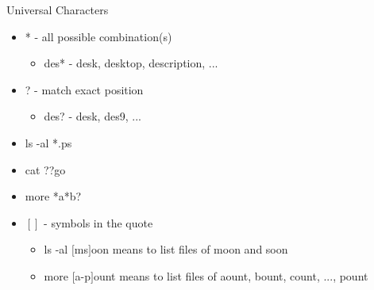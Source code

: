 \documentclass{beamer}
\begin{document}
\begin{frame}{Universal Characters}
\begin{itemize}
\item * - all possible combination(s)
\begin{itemize}
\item des* - desk, desktop, description, ...
\end{itemize}
\item ? - match exact position
\begin{itemize}
\item des? - desk, des9, ...
\end{itemize}
\item ls -al *.ps
\item cat ??go
\item more *a*b?
\item $[ ]$ - symbols in the quote
\begin{itemize}
\item ls -al $[$ms$]$oon means to list files of moon and soon
\item more $[$a-p$]$ount means to list files of aount, bount, count, ...,  pount
\end{itemize}
\end{itemize}
\end{frame}
\end{document}
